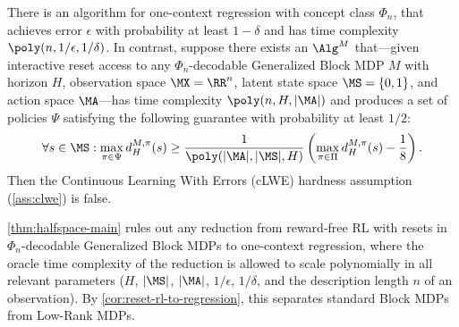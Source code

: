 \begin{theorem}\label{thm:halfspace-main}
There is an algorithm for one-context regression with concept class $\Phi_n$, that achieves error $\epsilon$ with probability at least $1-\delta$ and has time complexity $\poly(n,1/\epsilon,1/\delta)$.
In contrast, suppose there exists an $\Alg^M$ that---given interactive reset access to any $\Phi_n$-decodable Generalized Block MDP $M$ with horizon $H$, observation space $\MX=\RR^n$, latent state space $\MS=\{0,1\}$, and action space $\MA$---has time complexity $\poly(n,H,|\MA|)$ and produces a set of policies $\Psi$ satisfying the following guarantee with probability at least $1/2$:
\begin{equation} \forall s \in \MS: \max_{\pi\in\Psi} d^{M,\pi}_H(s) \geq \frac{1}{\poly(|\MA|, |\MS|, H)} \left(\max_{\pi\in\Pi} d^{M,\pi}_H(s) - \frac{1}{8}\right).\label{eq:gen-block-rfrl}\end{equation}
Then the Continuous Learning With Errors (cLWE) hardness assumption (\cref{ass:clwe}) is false. %
\end{theorem}
\cref{thm:halfspace-main} rules out any reduction from reward-free RL with resets in $\Phi_n$-decodable Generalized Block MDPs to one-context regression, where the oracle time complexity of the reduction is allowed to scale polynomially in all relevant parameters ($H$, $|\MS|$, $|\MA|$, $1/\epsilon$, $1/\delta$, and the description length $n$ of an observation). By \cref{cor:reset-rl-to-regression}, this separates standard Block MDPs from Low-Rank MDPs. 







